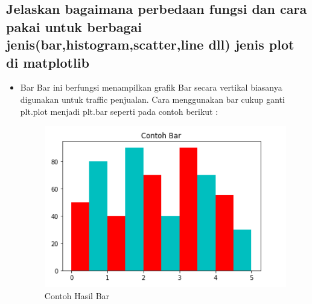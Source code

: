 \subsection{Jelaskan bagaimana perbedaan fungsi dan cara pakai untuk berbagai jenis(bar,histogram,scatter,line dll) jenis plot di matplotlib}
\begin{itemize}
	\item Bar\newline
	Bar ini berfungsi menampilkan grafik Bar secara vertikal biasanya digunakan untuk traffic penjualan.\newline
	Cara menggunakan bar cukup ganti plt.plot menjadi plt.bar seperti pada contoh berikut :

	

\begin{figure}[h]
\centering
\includegraphics[scale=0.3]{figures/6/Teori/1174025/no3b.png}
\caption{Contoh Hasil Bar}
\label{fig:contoh}
\end{figure}
\end{itemize}

